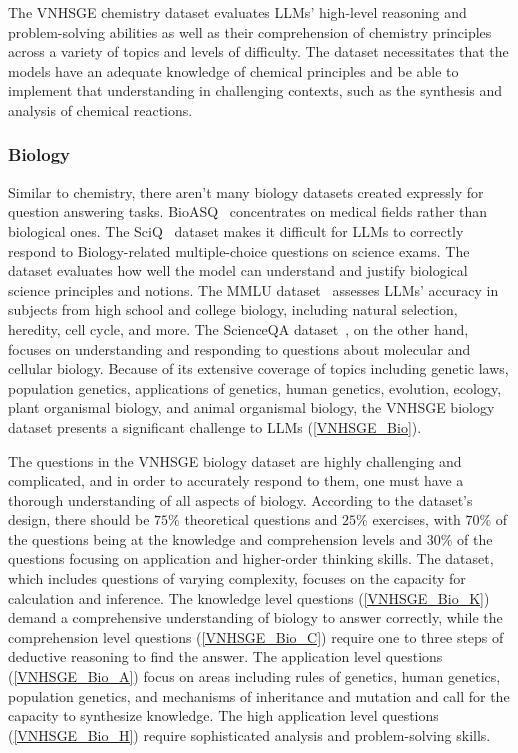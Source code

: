 \documentclass{article}
\begin{document}
{	The VNHSGE chemistry dataset evaluates LLMs' high-level reasoning and problem-solving abilities as well as their comprehension of chemistry principles across a variety of topics and levels of difficulty. The dataset necessitates that the models have an adequate knowledge of chemical principles and be able to implement that understanding in challenging contexts, such as the synthesis and analysis of chemical reactions.
	
	\subsubsection{Biology}
	
	Similar to chemistry, there aren't many biology datasets created expressly for question answering tasks. BioASQ~\cite{tsatsaronis2015overview} concentrates on medical fields rather than biological ones. The SciQ~\cite{welbl2017crowdsourcing} dataset makes it difficult for LLMs to correctly respond to Biology-related multiple-choice questions on science exams. The dataset evaluates how well the model can understand and justify biological science principles and notions. The MMLU dataset~\cite{hendrycks2020measuring} assesses LLMs' accuracy in subjects from high school and college biology, including natural selection, heredity, cell cycle, and more. The ScienceQA dataset~\cite{lu2022learn}, on the other hand, focuses on understanding and responding to questions about molecular and cellular biology. Because of its extensive coverage of topics including genetic laws, population genetics, applications of genetics, human genetics, evolution, ecology, plant organismal biology, and animal organismal biology, the VNHSGE biology dataset presents a significant challenge to LLMs (\ref{VNHSGE_Bio}). 
	
	The questions in the VNHSGE biology dataset are highly challenging and complicated, and in order to accurately respond to them, one must have a thorough understanding of all aspects of biology. According to the dataset's design, there should be $75\%$ theoretical questions and $25\%$ exercises, with $70\%$ of the questions being at the knowledge and comprehension levels and $30\%$ of the questions focusing on application and higher-order thinking skills. The dataset, which includes questions of varying complexity, focuses on the capacity for calculation and inference. The knowledge level questions (\ref{VNHSGE_Bio_K}) demand a comprehensive understanding of biology to answer correctly, while the comprehension level questions (\ref{VNHSGE_Bio_C}) require one to three steps of deductive reasoning to find the answer. The application level questions (\ref{VNHSGE_Bio_A}) focus on areas including rules of genetics, human genetics, population genetics, and mechanisms of inheritance and mutation and call for the capacity to synthesize knowledge. The high application level questions (\ref{VNHSGE_Bio_H}) require sophisticated analysis and problem-solving skills.
	
}
\end{document}
